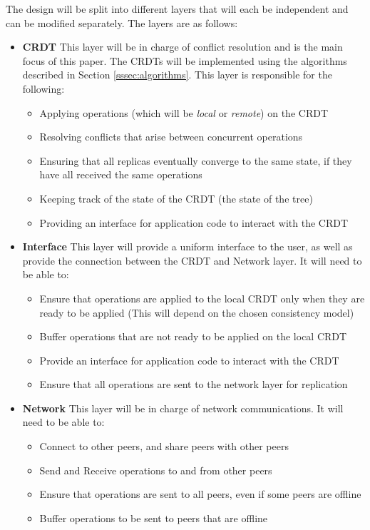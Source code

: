 \documentclass[12pt]{article}
\begin{document}
The design will be split into different layers that will each be independent and can be modified separately. The layers are as follows:
\begin{itemize}
    \item \textbf{CRDT} This layer will be in charge of conflict resolution and is the main focus of this paper. The CRDTs will be implemented using the algorithms described in Section \ref{sssec:algorithms}. This layer is responsible for the following: 
        \begin{itemize}
            \item Applying operations (which will be \textit{local} or \textit{remote}) on the CRDT
            \item Resolving conflicts that arise between concurrent operations 
            \item Ensuring that all replicas eventually converge to the same state, if they have all received the same operations
            \item Keeping track of the state of the CRDT (the state of the tree)
            \item Providing an interface for application code to interact with the CRDT
        \end{itemize}

    \item \textbf{Interface} This layer will provide a uniform interface to the user, as well as provide the connection between the CRDT and Network layer. It will need to be able to:
        \begin{itemize}
            \item Ensure that operations are applied to the local CRDT only when they are ready to be applied (This will depend on the chosen consistency model)
            \item Buffer operations that are not ready to be applied on the local CRDT
            \item Provide an interface for application code to interact with the CRDT
            \item Ensure that all operations are sent to the network layer for replication
        \end{itemize}
    \item \textbf{Network} This layer will be in charge of network communications. It will need to be able to:
        \begin{itemize}
            \item Connect to other peers, and share peers with other peers
            \item Send and Receive operations to and from other peers
            \item Ensure that operations are sent to all peers, even if some peers are offline
            \item Buffer operations to be sent to peers that are offline
        \end{itemize}
\end{itemize}
\end{document}
